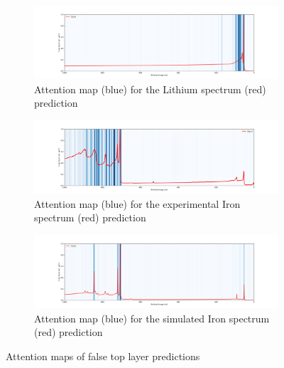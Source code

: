 \begin{figure}[H]

    \begin{subfigure}[b]{1\textwidth}
            \includegraphics[width=\textwidth]{Figures/attention_map_Li.png}
            \caption{Attention map (blue) for the Lithium spectrum (red) prediction}
            \label{att:Li}
    \end{subfigure}
    \begin{subfigure}[b]{1\textwidth}
            \includegraphics[width=\textwidth]{Figures/attention_map_Fe.png}
            \caption{Attention map (blue) for the experimental Iron spectrum (red) prediction}
            \label{att:Fe}
    \end{subfigure}
    
    \begin{subfigure}[b]{1\textwidth}
            \includegraphics[width=\textwidth]{Figures/attention_map_Fe_Training.png}
            \caption{Attention map (blue) for the simulated Iron spectrum (red) prediction}
            \label{att:FeSim}
    \end{subfigure}
\caption{Attention maps of false top layer predictions}
\end{figure}


